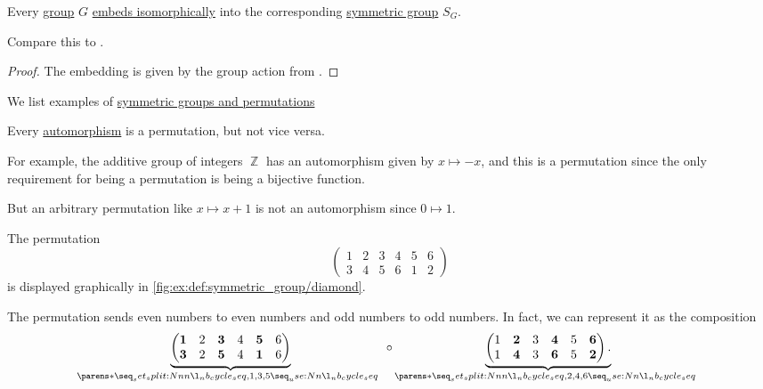 \begin{theorem}\label{thm:cayleys_theorem}
  Every \hyperref[def:group]{group} \( G \) \hyperref[rem:embeds_isomorphically]{embeds isomorphically} into the corresponding \hyperref[def:symmetric_group]{symmetric group} \( S_G \).
\end{theorem}
\begin{comments}
  \item Compare this to .
\end{comments}
\begin{proof}
  The embedding is given by the group action from .
\end{proof}

\begin{example}\label{ex:def:symmetric_group}
  We list examples of \hyperref[def:symmetric_group]{symmetric groups and permutations}
  \begin{thmenum}
     Every \hyperref[def:morphism_invertibility/automorphism]{automorphism} is a permutation, but not vice versa.

    For example, the additive group of integers \( \BbbZ \) has an automorphism given by \( x \mapsto -x \), and this is a permutation since the only requirement for being a permutation is being a bijective function.

    But an arbitrary permutation like \( x \mapsto x + 1 \) is not an automorphism since \( 0 \mapsto 1 \).

     The permutation
    \begin{equation}\label{eq:ex:def:symmetric_group/diamond}
      \begin{pmatrix}
        1 & 2 & 3 & 4 & 5 & 6 \\
        3 & 4 & 5 & 6 & 1 & 2
      \end{pmatrix}
    \end{equation}
    is displayed graphically in \ref{fig:ex:def:symmetric_group/diamond}.

    The permutation sends even numbers to even numbers and odd numbers to odd numbers. In fact, we can represent it as the composition
    \begin{equation*}
      \underbrace
        {
          \begin{pmatrix}
            \mathbf{1} & 2 & \mathbf{3} & 4 & \mathbf{5} & 6 \\
            \mathbf{3} & 2 & \mathbf{5} & 4 & \mathbf{1} & 6
          \end{pmatrix}
        }
        _
        {
          \cycle{ 1, 3, 5 }
        }
      \bincirc
      \underbrace
        {
          \begin{pmatrix}
            1 & \mathbf{2} & 3 & \mathbf{4} & 5 & \mathbf{6} \\
            1 & \mathbf{4} & 3 & \mathbf{6} & 5 & \mathbf{2}
          \end{pmatrix}.
        }
        _
        {
          \cycle{ 2, 4, 6 }
        }
    \end{equation*}


\end{thmenum}
\end{example}
